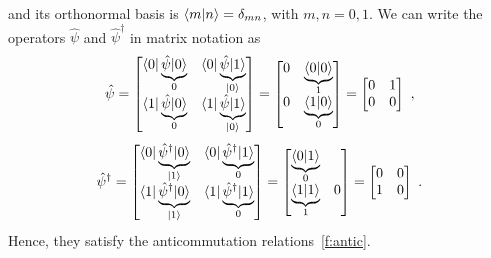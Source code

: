     and its orthonormal basis is $\langle m\vert n\rangle = \delta_{mn}$, with $m, n = 0, 1$. We can write the operators $\hat \psi$ and $\hat \psi^\dagger$ in matrix notation as
    \begin{equation*}
        \hat \psi = \begin{bmatrix}
            \langle0\vert \underbrace{\hat \psi \vert0\rangle}_0 & \langle0\vert \underbrace{\hat \psi \vert1\rangle}_{\vert0\rangle} \\ \langle1\vert \underbrace{\hat \psi \vert0\rangle}_0 & \langle1\vert \underbrace{\hat \psi \vert1\rangle}_{\vert0\rangle} \\
        \end{bmatrix} = \begin{bmatrix}
            0 & \underbrace{\langle0\vert0\rangle}_1 \\ 0 & \underbrace{\langle1\vert0\rangle}_0 \\
        \end{bmatrix} = \begin{bmatrix}
            0 & 1 \\ 0 & 0 \\
        \end{bmatrix} ~,
    \end{equation*}
    \begin{equation*}
        \hat \psi^\dagger = \begin{bmatrix}
            \langle0\vert \underbrace{\hat \psi^\dagger \vert0\rangle}_{\vert1\rangle} & \langle0\vert \underbrace{\hat \psi^\dagger \vert1\rangle}_0 \\ \langle1\vert \underbrace{\hat \psi^\dagger \vert0\rangle}_{\vert1\rangle} & \langle1\vert \underbrace{\hat \psi^\dagger \vert1\rangle}_0 \\
        \end{bmatrix} = \begin{bmatrix}
            \underbrace{\langle0\vert1\rangle}_0 & \\  \underbrace{\langle1\vert1\rangle}_1 &  0 \\
        \end{bmatrix} = \begin{bmatrix}
            0 & 0 \\ 1 & 0 \\
        \end{bmatrix} ~.
    \end{equation*}
    Hence, they satisfy the anticommutation relations~\eqref{f:antic}.
